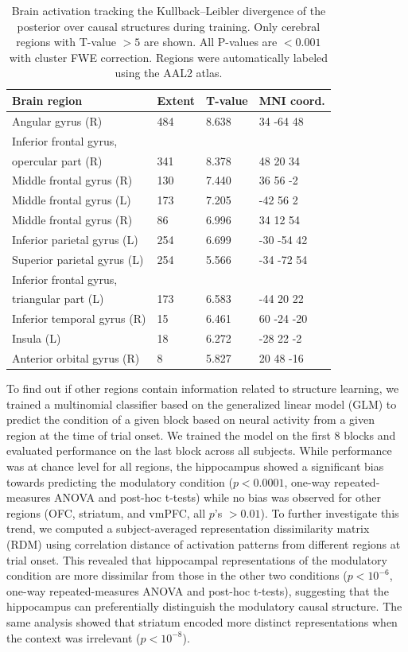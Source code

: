 \documentclass[10pt,letterpaper]{article}
\begin{document}
\begin{table}[!ht]
\begin{center} 
\caption{Brain activation tracking the Kullback--Leibler divergence of the posterior over causal structures during training. Only cerebral regions with T-value $ > 5$ are shown. All P-values are $< 0.001$ with cluster FWE correction. Regions were automatically labeled using the AAL2 atlas.} 
\label{kl-divergence-table} 
\vskip 0.12in
\begin{tabular}{llll} 
\hline
Brain region    &  Extent & T-value  & MNI coord. \\
\hline
Angular gyrus (R) &	484	& 8.638 &	34	-64	48\\
Inferior frontal gyrus,\\opercular part (R) &	341 &	8.378& 48	 20	34 \\
Middle frontal gyrus (R) &	130	& 7.440 &	36	56	-2 \\
Middle frontal gyrus (L) &	173	& 7.205 &	-42	56	2 \\
Middle frontal gyrus (R) &	86	& 6.996 &	34	12	54 \\
Inferior parietal gyrus (L) &	254 	& 6.699 &	-30	-54	42 \\
Superior parietal gyrus (L)	 & 254	& 5.566 &	-34	-72	54 \\
Inferior frontal gyrus,\\triangular part (L) &	173	& 6.583 & -44	20	22 \\
Inferior temporal gyrus (R) &	 15	& 6.461 &	60	-24	-20 \\
Insula (L)	& 18	 & 6.272	& -28	22	-2 \\
Anterior orbital gyrus (R)& 	8  &	5.827 &	20	48	-16 \\
\hline
\end{tabular} 
\end{center} 
\end{table}

To find out if other regions contain information related to structure learning, we trained a multinomial classifier based on the generalized linear model (GLM) to predict the condition of a given block based on neural activity from a given region at the time of trial onset. We trained the model on the first 8 blocks and evaluated performance on the last block across all subjects. While performance was at chance level for all regions, the hippocampus showed a significant bias towards predicting the modulatory condition ($p < 0.0001$, one-way repeated-measures ANOVA and post-hoc t-tests) while no bias was observed for other regions (OFC, striatum, and vmPFC, all $p$'s $> 0.01$). To further investigate this trend, we computed a subject-averaged representation dissimilarity matrix (RDM) using correlation distance of activation patterns from different regions at trial onset. This revealed that hippocampal representations of the modulatory condition are more dissimilar from those in the other two conditions ($p < 10^{-6}$, one-way repeated-measures ANOVA and post-hoc t-tests), suggesting that the hippocampus can preferentially distinguish the modulatory causal structure. The same analysis showed that striatum encoded more distinct representations when the context was irrelevant ($p < 10^{-8}$).
\end{document}
